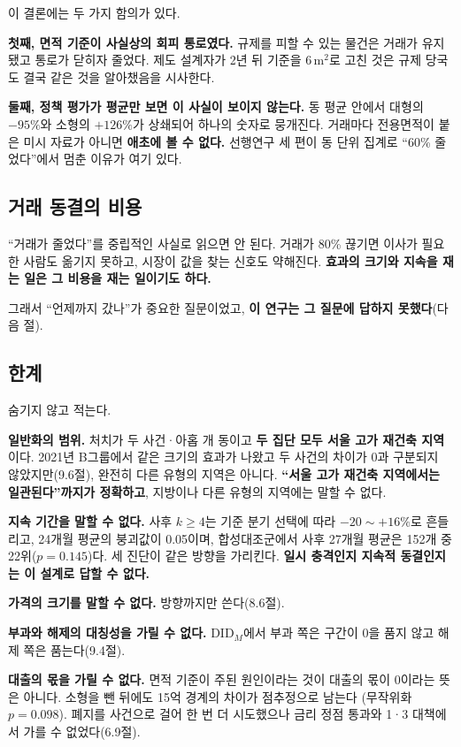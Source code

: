 이 결론에는 두 가지 함의가 있다.

\textbf{첫째, 면적 기준이 사실상의 회피 통로였다.} 규제를 피할 수 있는 물건은
거래가 유지됐고 통로가 닫히자 줄었다. 제도 설계자가 2년 뒤 기준을 6\,m$^2$로
고친 것은 규제 당국도 결국 같은 것을 알아챘음을 시사한다.

\textbf{둘째, 정책 평가가 평균만 보면 이 사실이 보이지 않는다.} 동 평균 안에서
대형의 $-95\%$와 소형의 $+126\%$가 상쇄되어 하나의 숫자로 뭉개진다. 거래마다
전용면적이 붙은 미시 자료가 아니면 \textbf{애초에 볼 수 없다.} 선행연구 세 편이
동 단위 집계로 ``60\% 줄었다''에서 멈춘 이유가 여기 있다.

\subsection{거래 동결의 비용}

``거래가 줄었다''를 중립적인 사실로 읽으면 안 된다. 거래가 80\% 끊기면 이사가
필요한 사람도 옮기지 못하고, 시장이 값을 찾는 신호도 약해진다. \textbf{효과의
크기와 지속을 재는 일은 그 비용을 재는 일이기도 하다.}

그래서 ``언제까지 갔나''가 중요한 질문이었고, \textbf{이 연구는 그 질문에
답하지 못했다}(다음 절).

\subsection{한계}

숨기지 않고 적는다.

\textbf{일반화의 범위.} 처치가 두 사건·아홉 개 동이고 \textbf{두 집단 모두 서울
고가 재건축 지역}이다. 2021년 B그룹에서 같은 크기의 효과가 나왔고 두 사건의
차이가 0과 구분되지 않았지만(9.6절), 완전히 다른 유형의 지역은 아니다.
\textbf{``서울 고가 재건축 지역에서는 일관된다''까지가 정확하고}, 지방이나 다른
유형의 지역에는 말할 수 없다.

\textbf{지속 기간을 말할 수 없다.} 사후 $k \geq 4$는 기준 분기 선택에 따라
$-20 \sim +16\%$로 흔들리고, 24개월 평균의 붕괴값이 0.05이며, 합성대조군에서
사후 27개월 평균은 152개 중 22위($p=0.145$)다. 세 진단이 같은 방향을 가리킨다.
\textbf{일시 충격인지 지속적 동결인지는 이 설계로 답할 수 없다.}

\textbf{가격의 크기를 말할 수 없다.} 방향까지만 쓴다(8.6절).

\textbf{부과와 해제의 대칭성을 가릴 수 없다.} $\text{DID}_M$에서 부과 쪽은 구간이
0을 품지 않고 해제 쪽은 품는다(9.4절).

\textbf{대출의 몫을 가릴 수 없다.} 면적 기준이 주된 원인이라는 것이 대출의 몫이
0이라는 뜻은 아니다. 소형을 뺀 뒤에도 15억 경계의 차이가 점추정으로 남는다
(무작위화 $p=0.098$). 폐지를 사건으로 걸어 한 번 더 시도했으나 금리 정점 통과와
1·3 대책에서 가를 수 없었다(6.9절).

